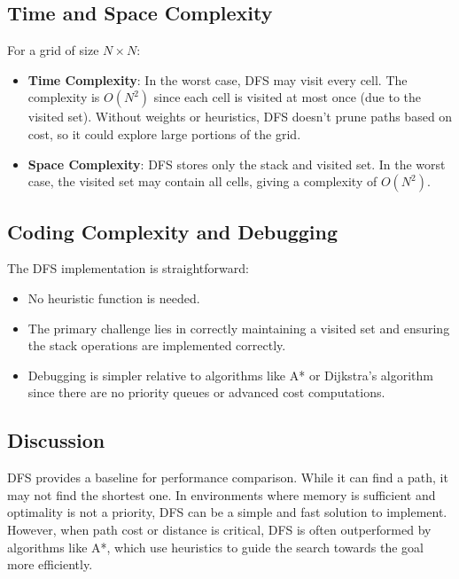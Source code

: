 \documentclass[12pt]{article}
\begin{document}
\subsection{Time and Space Complexity}
For a grid of size \( N \times N \):

\begin{itemize}
    \item \textbf{Time Complexity}: In the worst case, DFS may visit every cell. The complexity is \( O(N^2) \) since each cell is visited at most once (due to the visited set). Without weights or heuristics, DFS doesn't prune paths based on cost, so it could explore large portions of the grid.
    \item \textbf{Space Complexity}: DFS stores only the stack and visited set. In the worst case, the visited set may contain all cells, giving a complexity of \( O(N^2) \).
\end{itemize}

\subsection{Coding Complexity and Debugging}
The DFS implementation is straightforward:
\begin{itemize}
    \item No heuristic function is needed.
    \item The primary challenge lies in correctly maintaining a visited set and ensuring the stack operations are implemented correctly.
    \item Debugging is simpler relative to algorithms like A* or Dijkstra's algorithm since there are no priority queues or advanced cost computations.
\end{itemize}

\subsection{Discussion}
DFS provides a baseline for performance comparison. While it can find a path, it may not find the shortest one. In environments where memory is sufficient and optimality is not a priority, DFS can be a simple and fast solution to implement. However, when path cost or distance is critical, DFS is often outperformed by algorithms like A*, which use heuristics to guide the search towards the goal more efficiently.
\newpage
\end{document}
